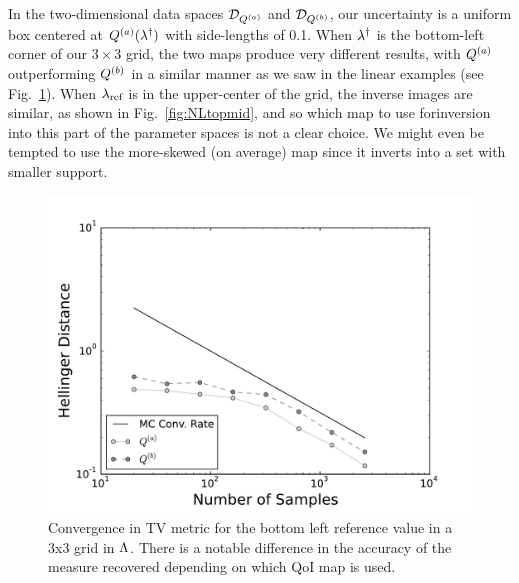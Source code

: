 In the two-dimensional data spaces $\mathcal{D}_{Q^{(a)}}$ and $\mathcal{D}_{Q^{(b)}}$, our uncertainty is a uniform box centered at $Q^{(a)}(\lambda^\dagger)$ with side-lengths of 0.1.
When $\lambda^\dagger$ is the bottom-left corner of our $3\times3$ grid, the two maps produce very different results, with $Q^{(a)}$ outperforming $Q^{(b)}$ in a similar manner as we saw in the linear examples (see Fig.~\ref{fig:NLbotleft}).
When $\lambda_{\text{ref}}$ is in the upper-center of the grid, the inverse images are similar, as shown in Fig.~\ref{fig:NLtopmid}, and so which map to use forinversion into this part of the parameter spaces is not a clear choice. We might even be tempted to use the more-skewed (on average) map since it inverts into a set with smaller support.


\begin{figure}[h]
  \includegraphics[width=\linewidth]{./images/pt0Plot-reg_BigN_40000_reg_M_1_rand_I_100000}
  \caption{Convergence in TV metric for the bottom left reference value in a 3x3 grid in ${\Lambda}$. There is a notable difference in the accuracy of the measure recovered depending on which QoI map is used.}
  \label{fig:NLbotleft}
\end{figure}

